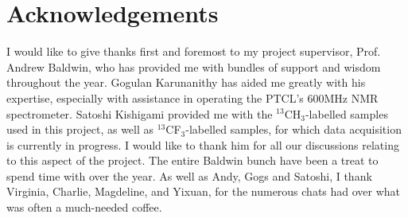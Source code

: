 \chapter{Acknowledgements}%

I would like to give thanks first and foremost to my project supervisor, Prof. Andrew Baldwin, who has provided me with bundles of support and wisdom throughout the year. Gogulan Karunanithy has aided me greatly with his expertise, especially with assistance in operating the PTCL's 600MHz NMR spectrometer. Satoshi Kishigami provided me with the $^{13}$CH$_3$-labelled samples used in this project, as well as $^{13}$CF$_3$-labelled samples, for which data acquisition is currently in progress. I would like to thank him for all our discussions relating to this aspect of the project. The entire Baldwin bunch have been a treat to spend time with over the year. As well as Andy, Gogs and Satoshi, I thank Virginia, Charlie, Magdeline, and Yixuan, for the numerous chats had over what was often a much-needed coffee.